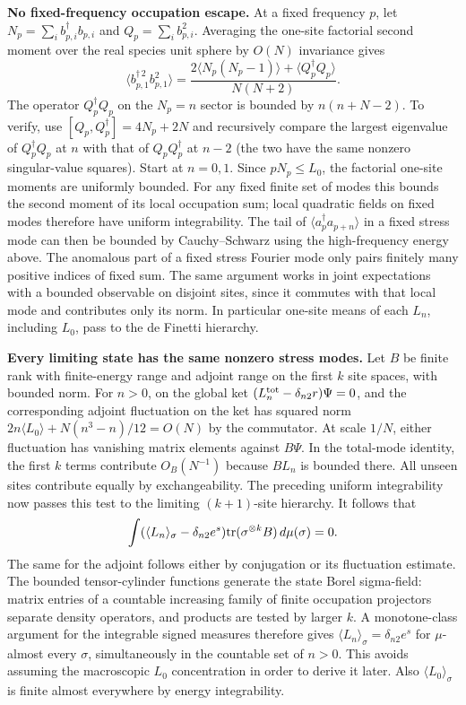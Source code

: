 \documentclass[11pt]{article}
\begin{document}
\textbf{No fixed-frequency occupation escape.} At a fixed frequency \(p\), let \(N_p=\sum_i b_{p,i}^\dagger b_{p,i}\) and \(Q_p=\sum_i b_{p,i}^2\). Averaging the one-site factorial second moment over the real species unit sphere by \(O(N)\) invariance gives \[
 \langle b_{p,1}^{\dagger\,2}b_{p,1}^{2}\rangle
    =\frac{2\langle N_p(N_p-1)\rangle+\langle Q_p^\dagger Q_p\rangle}{N(N+2)}.
\] The operator \(Q_p^\dagger Q_p\) on the \(N_p=n\) sector is bounded by \(n(n+N-2)\). To verify, use \([Q_p,Q_p^\dagger]=4N_p+2N\) and recursively compare the largest eigenvalue of \(Q_p^\dagger Q_p\) at \(n\) with that of \(Q_pQ_p^\dagger\) at \(n-2\) (the two have the same nonzero singular-value squares). Start at \(n=0,1\). Since \(pN_p\le L_0\), the factorial one-site moments are uniformly bounded. For any fixed finite set of modes this bounds the second moment of its local occupation sum; local quadratic fields on fixed modes therefore have uniform integrability. The tail of \(\langle a^\dagger_p a_{p+n}\rangle\) in a fixed stress mode can then be bounded by Cauchy--Schwarz using the high-frequency energy above. The anomalous part of a fixed stress Fourier mode only pairs finitely many positive indices of fixed sum. The same argument works in joint expectations with a bounded observable on disjoint sites, since it commutes with that local mode and contributes only its norm. In particular one-site means of each \(L_n\), including \(L_0\), pass to the de Finetti hierarchy.

\textbf{Every limiting state has the same nonzero stress modes.} Let \(B\) be finite rank with finite-energy range and adjoint range on the first \(k\) site spaces, with bounded norm. For \(n>0\), on the global ket \((L_n^{\rm tot}-\delta_{n2}r)\Psi=0\), and the corresponding adjoint fluctuation on the ket has squared norm \(2n\langle L_0\rangle+N(n^3-n)/12=O(N)\) by the commutator. At scale \(1/N\), either fluctuation has vanishing matrix elements against \(B\Psi\). In the total-mode identity, the first \(k\) terms contribute \(O_B(N^{-1})\) because \(B L_n\) is bounded there. All unseen sites contribute equally by exchangeability. The preceding uniform integrability now passes this test to the limiting \((k+1)\)-site hierarchy. It follows that \[
 \int (\langle L_n\rangle_\sigma-\delta_{n2}e^s)
                    {\rm tr}(\sigma^{\otimes k} B)\,d\mu(\sigma)=0 .
\] The same for the adjoint follows either by conjugation or its fluctuation estimate. The bounded tensor-cylinder functions generate the state Borel sigma-field: matrix entries of a countable increasing family of finite occupation projectors separate density operators, and products are tested by larger \(k\). A monotone-class argument for the integrable signed measures therefore gives \(\langle L_n\rangle_\sigma=\delta_{n2}e^s\) for \(\mu\)-almost every \(\sigma\), simultaneously in the countable set of \(n>0\). This avoids assuming the macroscopic \(L_0\) concentration in order to derive it later. Also \(\langle L_0\rangle_\sigma\) is finite almost everywhere by energy integrability.
\end{document}
